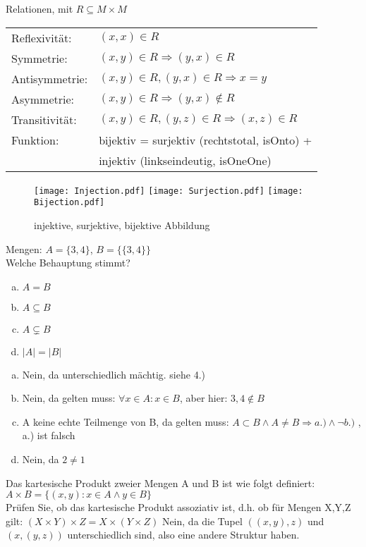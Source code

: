 \begin{card}
	Relationen, mit $R \subseteq M \times M$\\
	\begin{tabular}{ll}
		Reflexivität:& $(x, x) \in R $\\
		Symmetrie:&	$(x, y) \in R \Rightarrow (y, x) \in R$\\
		Antisymmetrie:& $(x, y) \in R, (y, x) \in R \Rightarrow x=y$\\
		Asymmetrie:& $(x, y) \in R \Rightarrow (y, x) \notin R$\\
		Transitivität:& $(x, y) \in R, (y, z) \in R \Rightarrow (x, z) \in R$\\
		Funktion: & bijektiv = surjektiv (rechtstotal, isOnto) +\\
	     	      & injektiv (linkseindeutig, isOneOne)
		\end{tabular}
		\begin{figure}[h]
		\centering
		\texttt{[image: Injection.pdf]}
		\texttt{[image: Surjection.pdf]}
		\texttt{[image: Bijection.pdf]}
		\caption{injektive, surjektive, bijektive Abbildung}
		\end{figure}
\end{card}

\begin{card}
	Mengen: $A = \{3, 4\}$, $B = \{\{3, 4\}\}$\\Welche Behauptung stimmt?
	\begin{enumerate}[a)]
	\item $A = B$
	\item $A \subseteq B$
	\item $A \subsetneq B$
	\item $|A| = |B|$
	\end{enumerate}
	\hr
	\begin{enumerate}[a)]
	\item Nein, da unterschiedlich mächtig. siehe 4.)
	\item Nein, da gelten muss: $\forall x \in A: x \in B$, aber hier: $3,4 \notin B$
	\item A keine echte Teilmenge von B, da gelten muss: $A \subset B \land A \neq B \Rightarrow a.) \land \lnot b.)$ , a.) ist falsch
	\item Nein, da $2 \neq 1$
	\end{enumerate}
\end{card}

\begin{card}
	Das kartesische Produkt zweier Mengen A und B ist wie folgt definiert:
	$A \times B = \{(x,y):x	\in	A \land	y \in B\}$\\
	Prüfen Sie, ob das kartesische Produkt assoziativ ist, d.h. ob für Mengen X,Y,Z gilt:
	$(X	\times Y)\times Z=X \times(Y \times Z)$
	\hr
	Nein, da die Tupel $((x,y),z)$ und $(x,(y,z))$ unterschiedlich sind, also eine andere Struktur haben.
\end{card}

